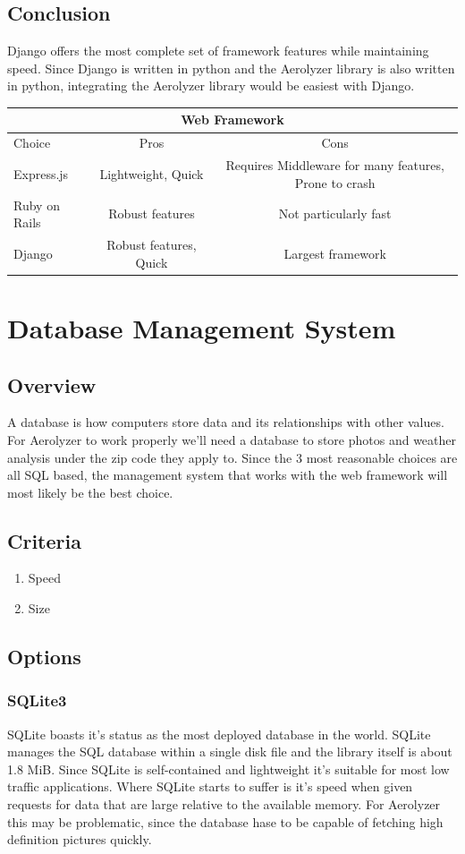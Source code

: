 \documentclass[onecolumn, draftclsnofoot,10pt, compsoc]{IEEEtran}
\begin{document}
\begin{singlespace}
\subsection{Conclusion}
Django offers the most complete set of framework features while maintaining speed. Since Django is written in python and the Aerolyzer library is also written in python, integrating the Aerolyzer library would be easiest with Django. \cite{DjangoOver}
\begin{center}
	\begin{tabular}{|l|c|c|} 
		\hline
		\multicolumn{3}{|c|}{Web Framework} \\
		\hline
		Choice & Pros & Cons\\ [0.5ex] 
		\hline\hline
		Express.js & Lightweight, Quick & Requires Middleware for many features, Prone to crash \\ 
		\hline
		Ruby on Rails & Robust features & Not particularly fast\\
		\hline
		Django & Robust features, Quick & Largest framework\\ [1ex] 
		\hline
	\end{tabular}
\end{center}


\section{Database Management System}
\subsection{Overview}
A database is how computers store data and its relationships with other values. For Aerolyzer to work properly we'll need a database to store photos and weather analysis under the zip code they apply to. Since the 3 most reasonable choices are all SQL based, the management system that works with the web framework will most likely be the best choice.
\subsection{Criteria}
\begin{enumerate}
	\item Speed
	\item Size
\end{enumerate}
\subsection{Options}
\subsubsection{SQLite3}
SQLite boasts it's status as the most deployed database in the world\cite{SQLiteAbout}.
SQLite manages the SQL database within a single disk file and the library itself is about 1.8 MiB\cite{SQLiteAbout}.
Since SQLite is self-contained and lightweight it's suitable for most low traffic applications\cite{SQLiteUse}.
Where SQLite starts to suffer is it's speed when given requests for data that are large relative to the available memory. For Aerolyzer this may be problematic, since the database hase to be capable of fetching high definition pictures quickly\cite{SQLiteAbout}.

\end{singlespace}
\end{document}
